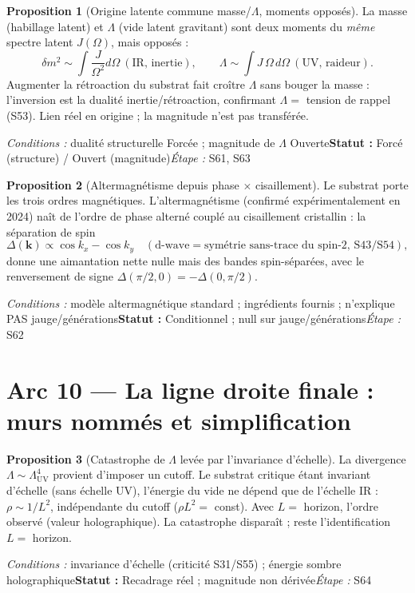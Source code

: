 \documentclass[11pt,a4paper]{article}
\theoremstyle{definition}
\newtheorem{prop}{Proposition}
\newcommand{\statut}[3]{\par\smallskip\noindent\textit{Conditions :} #1\quad\textbf{Statut :} #2\quad\textit{Étape :} #3\par\medskip}
\begin{document}
\begin{prop}[Origine latente commune masse/$\Lambda$, moments opposés]
La masse (habillage latent) et $\Lambda$ (vide latent gravitant) sont deux moments du \emph{même} spectre latent $J(\Omega)$, mais opposés :
\[ \delta m^2\sim\!\int\!\frac{J}{\Omega^2}d\Omega\ (\text{IR, inertie}),\qquad \Lambda\sim\!\int\! J\,\Omega\,d\Omega\ (\text{UV, raideur}). \]
Augmenter la rétroaction du substrat fait croître $\Lambda$ sans bouger la masse : l'inversion est la dualité inertie/rétroaction, confirmant $\Lambda=$ tension de rappel (S53). Lien réel en origine ; la magnitude n'est pas transférée.
\end{prop}
\statut{dualité structurelle Forcée ; magnitude de $\Lambda$ Ouverte}{Forcé (structure) / Ouvert (magnitude)}{S61, S63}

\begin{prop}[Altermagnétisme depuis phase $\times$ cisaillement]
Le substrat porte les trois ordres magnétiques. L'altermagnétisme (confirmé expérimentalement en 2024) naît de l'ordre de phase alterné couplé au cisaillement cristallin : la séparation de spin
\[ \Delta(\mathbf k)\propto \cos k_x-\cos k_y \quad(\text{d-wave}=\text{symétrie sans-trace du spin-2, S43/S54}), \]
donne une aimantation nette nulle mais des bandes spin-séparées, avec le renversement de signe $\Delta(\pi/2,0)=-\Delta(0,\pi/2)$.
\end{prop}
\statut{modèle altermagnétique standard ; ingrédients fournis ; n'explique PAS jauge/générations}{Conditionnel ; null sur jauge/générations}{S62}



\section*{Arc 10 — La ligne droite finale : murs nommés et simplification}

\begin{prop}[Catastrophe de $\Lambda$ levée par l'invariance d'échelle]
La divergence $\Lambda\sim\Lambda_{\mathrm{UV}}^4$ provient d'imposer un cutoff. Le substrat critique étant invariant d'échelle (sans échelle UV), l'énergie du vide ne dépend que de l'échelle IR : $\rho\sim 1/L^2$, indépendante du cutoff ($\rho L^2=$ const). Avec $L=$ horizon, l'ordre observé (valeur holographique). La catastrophe disparaît ; reste l'identification $L=$ horizon.
\end{prop}
\statut{invariance d'échelle (criticité S31/S55) ; énergie sombre holographique}{Recadrage réel ; magnitude non dérivée}{S64}
\end{document}
